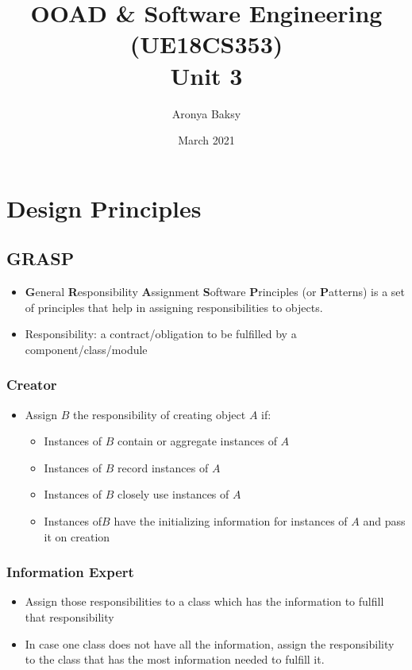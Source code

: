 \documentclass{article}
\title{OOAD \& Software Engineering (UE18CS353) \\
    Unit 3}
\author{Aronya Baksy}
\date{March 2021}
\begin{document}
\maketitle
\section{Design Principles}
\subsection{GRASP}
\begin{itemize}
    \item \textbf{G}eneral \textbf{R}esponsibility \textbf{A}ssignment \textbf{S}oftware \textbf{P}rinciples (or \textbf{P}atterns) is a set of principles that help in assigning responsibilities to objects.
    
    \item Responsibility: a contract/obligation to be fulfilled by a component/class/module
\end{itemize}

\subsubsection{Creator}
\begin{itemize}
    \item Assign $B$ the responsibility of creating object $A$ if:
    \begin{itemize}
        \item Instances of $B$ contain or aggregate instances of $A$
        
        \item Instances of $B$ record instances of $A$
        
        \item Instances of $B$ closely use instances of $A$
        
        \item Instances of$B$ have the initializing information for instances of $A$ and pass it on creation
    \end{itemize}
\end{itemize}

\subsubsection{Information Expert}
\begin{itemize}
    \item Assign those responsibilities to a class which has the information to fulfill that responsibility
    
    \item In case one class does not have all the information, assign the responsibility to the class that has the most information needed to fulfill it. 
\end{itemize}
\end{document}
